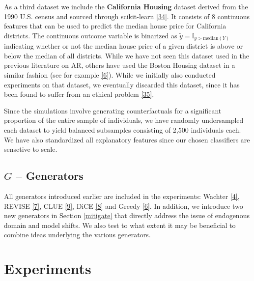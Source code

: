 \documentclass[conference,final,]{IEEEtran}
\theoremstyle{definition}
\theoremstyle{definition}
\theoremstyle{definition}
\theoremstyle{definition}
\theoremstyle{remark}
\begin{document}
As a third dataset we include the \textbf{California Housing} dataset derived from the 1990 U.S. census and sourced through scikit-learn \protect\hyperlink{ref-pace1997sparse}{{[}34{]}}. It consists of 8 continuous features that can be used to predict the median house price for California districts. The continuous outcome variable is binarized as \(\tilde{y}=\mathbb{I}_{y>\text{median}(Y)}\) indicating whether or not the median house price of a given district is above or below the median of all districts. While we have not seen this dataset used in the previous literature on AR, others have used the Boston Housing dataset in a similar fashion (see for example \protect\hyperlink{ref-schut2021generating}{{[}6{]}}). While we initially also conducted experiments on that dataset, we eventually discarded this dataset, since it has been found to suffer from an ethical problem \protect\hyperlink{ref-carlisle2019racist}{{[}35{]}}.

Since the simulations involve generating counterfactuals for a significant proportion of the entire sample of individuals, we have randomly undersampled each dataset to yield balanced subsamples consisting of 2,500 individuals each. We have also standardized all explanatory features since our chosen classifiers are sensetive to scale.

\hypertarget{g-generators}{%
\subsection{\texorpdfstring{\(G\) -- Generators}{G -- Generators}}\label{g-generators}}

All generators introduced earlier are included in the experiments: Wachter \protect\hyperlink{ref-wachter2017counterfactual}{{[}4{]}}, REVISE \protect\hyperlink{ref-joshi2019towards}{{[}7{]}}, CLUE \protect\hyperlink{ref-antoran2020getting}{{[}9{]}}, DiCE \protect\hyperlink{ref-mothilal2020explaining}{{[}8{]}} and Greedy \protect\hyperlink{ref-schut2021generating}{{[}6{]}}. In addition, we introduce two new generators in Section \ref{mitigate} that directly address the issue of endogenous domain and model shifts. We also test to what extent it may be beneficial to combine ideas underlying the various generators.

\hypertarget{empirical-2}{%
\section{Experiments}\label{empirical-2}}
\end{document}

